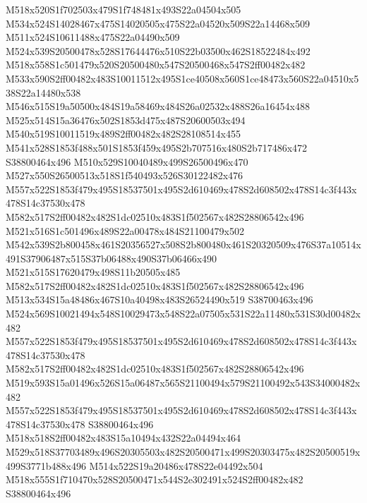 \documentclass{article}
\begin{document}
\begin{multicols}{2}
M518x520S1f702503x479S1f748481x493S22a04504x505 M534x524S14028467x475S14020505x475S22a04520x509S22a14468x509 M511x524S10611488x475S22a04490x509 M524x539S20500478x528S17644476x510S22b03500x462S18522484x492 M518x558S1c501479x520S20500480x547S20500468x547S2ff00482x482 M533x590S2ff00482x483S10011512x495S1ce40508x560S1ce48473x560S22a04510x538S22a14480x538 M546x515S19a50500x484S19a58469x484S26a02532x488S26a16454x488 M525x514S15a36476x502S1853d475x487S20600503x494 M540x519S10011519x489S2ff00482x482S28108514x455 M541x528S1853f488x501S1853f459x495S2b707516x480S2b717486x472 S38800464x496 M510x529S10040489x499S26500496x470 M527x550S26500513x518S1f540493x526S30122482x476 M557x522S1853f479x495S18537501x495S2d610469x478S2d608502x478S14c3f443x478S14c37530x478 M582x517S2ff00482x482S1dc02510x483S1f502567x482S28806542x496 M521x516S1c501496x489S22a00478x484S21100479x502 M542x539S2b800458x461S20356527x508S2b800480x461S20320509x476S37a10514x491S37906487x515S37b06488x490S37b06466x490 M521x515S17620479x498S11b20505x485 M582x517S2ff00482x482S1dc02510x483S1f502567x482S28806542x496 M513x534S15a48486x467S10a40498x483S26524490x519 S38700463x496 M524x569S10021494x548S10029473x548S22a07505x531S22a11480x531S30d00482x482 M557x522S1853f479x495S18537501x495S2d610469x478S2d608502x478S14c3f443x478S14c37530x478 M582x517S2ff00482x482S1dc02510x483S1f502567x482S28806542x496 M519x593S15a01496x526S15a06487x565S21100494x579S21100492x543S34000482x482 M557x522S1853f479x495S18537501x495S2d610469x478S2d608502x478S14c3f443x478S14c37530x478 S38800464x496 M518x518S2ff00482x483S15a10494x432S22a04494x464 M529x518S37703489x496S20305503x482S20500471x499S20303475x482S20500519x499S3771b488x496 M514x522S19a20486x478S22e04492x504 M518x555S1f710470x528S20500471x544S2e302491x524S2ff00482x482 S38800464x496






\end{multicols}
\end{document}
